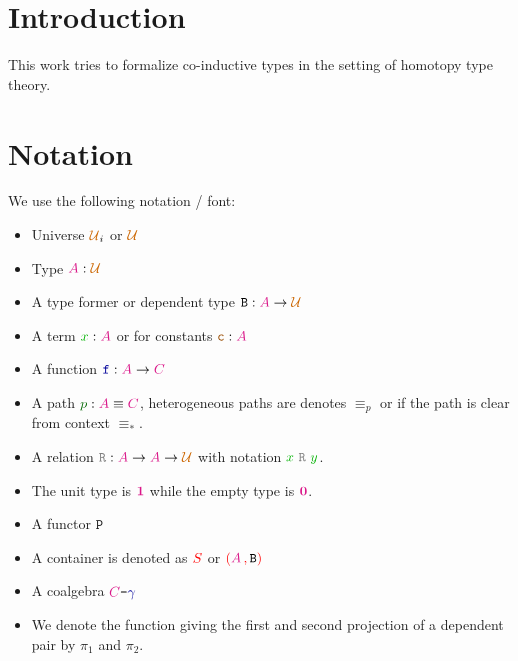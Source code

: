 \documentclass[twoside,11pt,openright]{report}
\theoremstyle{plain} %
\theoremstyle{definition}
\theoremstyle{remark}
\newcommand*{\term}[1]{\textcolor{green!70!black}{#1}} %
\newcommand*{\pathterm}[1]{\textcolor{green!40!black}{#1}}
\newcommand*{\type}[1]{\textcolor{magenta!90!black}{#1}}
\newcommand*{\container}[1]{\textcolor{red}{#1}}
\newcommand*{\containerpair}[2]{\textcolor{red}{(}#1\,\textcolor{red}{,}\,#2\textcolor{red}{)}}
\newcommand*{\universe}[1]{\textcolor{orange!80!black}{#1}}
\newcommand*{\unit}{\type{\textbf{1}}}
\newcommand*{\empt}{\type{\textbf{0}}}
\newcommand*{\coalg}[2]{#1\texttt{-}#2}
\newcommand*{\relation}[1]{\textcolor{gray}{\ensuremath{\mathtt{#1}}}}
\newcommand*{\constant}[1]{\textcolor{orange!60!black}{\ensuremath{\mathtt{#1}}}}
\newcommand*{\function}[1]{\textcolor{blue!60!black}{\ensuremath{\mathtt{#1}}}}
\newcommand*{\typeformer}[1]{\ensuremath{\mathtt{#1}}}
\newcommand*{\functor}[1]{\ensuremath{\mathbf{\mathtt{#1}}}}
\begin{document}
\chapter{Introduction} %
\label{ch:intro}
This work tries to formalize co-inductive types in the setting of homotopy type theory.




\chapter{Notation}
We use the following notation / font:
\begin{itemize}
\item Universe \(\universe{\mathcal{U}}_i\) or \(\universe{\mathcal{U}}\)
\item Type \(\type{A} : \universe{\mathcal{U}}\)
\item A type former or dependent type \(\typeformer{B} : \type{A} \rightarrow \universe{\mathcal{U}}\)
\item A term \(\term{x} : \type{A}\) or for constants \(\constant{c} : \type{A}\)
\item A function \(\function{f} : \type{A} \rightarrow \type{C}\)
\item A path \(\pathterm{p} : \type{A} \equiv \type{C}\), heterogeneous paths are denotes \(\equiv_p\) or if the path is clear from context \(\equiv_*\).
\item A relation \(\relation{R} : \type{A} \rightarrow \type{A} \rightarrow \universe{\mathcal{U}}\) with notation \(\term{x}~\relation{R}~\term{y}\).
\item The unit type is \(\unit\) while the empty type is \(\empt\).
\item A functor \(\functor{P}\)
\item A container is denoted as \(\container{S}\) or \(\containerpair{\type{A}}{\typeformer{B}}\)
\item A coalgebra \(\coalg{\type{C}}{\function{\gamma}}\)
\item We denote the function giving the first and second projection of a dependent pair by \(\pi_1\) and \(\pi_2\).
\end{itemize}
\end{document}
